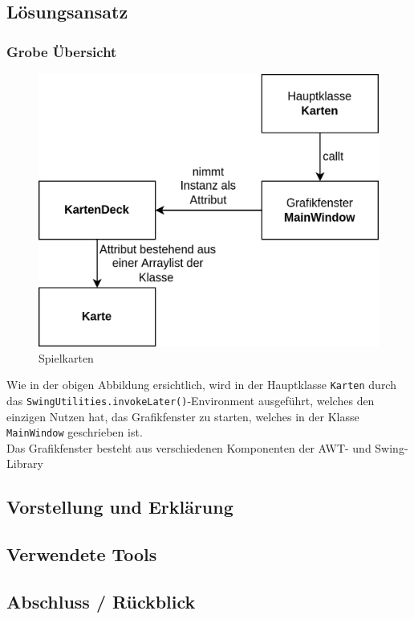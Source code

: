 \documentclass[a4paper,11pt]{article}
\begin{document}
\subsection{Lösungsansatz}

\subsubsection{Grobe Übersicht}
\begin{figure}[H]
    \centering
    \includegraphics[width=.6\textwidth]{media/grober-ansatz.png}
    \caption{Spielkarten}
\end{figure}

Wie in der obigen Abbildung ersichtlich, wird in der Hauptklasse \texttt{Karten} durch das \texttt{SwingUtilities.invokeLater()}-Environment ausgeführt, welches den einzigen Nutzen hat, das Grafikfenster zu starten, welches in der Klasse \texttt{MainWindow} geschrieben ist.\\

Das Grafikfenster besteht aus verschiedenen Komponenten der AWT- und Swing-Library

\subsection{Vorstellung und Erklärung}

\subsection{Verwendete Tools}

\subsection{Abschluss / Rückblick}
\end{document}
